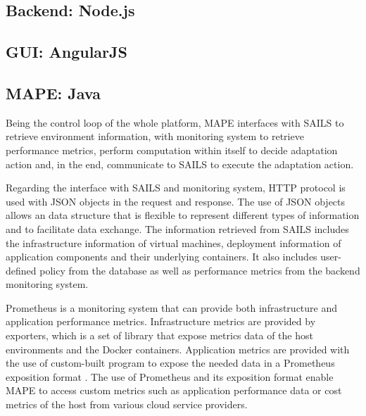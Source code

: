 \documentclass{seal_thesis}
\begin{document}
\subsection{Backend: Node.js}

\subsection{GUI: AngularJS}

\subsection{MAPE: Java}
Being the control loop of the whole platform, MAPE interfaces with SAILS to retrieve environment information, with monitoring system to retrieve performance metrics, perform computation within itself to decide adaptation action and, in the end, communicate to SAILS to execute the adaptation action.

Regarding the interface with SAILS and monitoring system, HTTP protocol is used with JSON objects in the request and response. The use of JSON objects allows an data structure that is flexible to represent different types of information and to facilitate data exchange. The information retrieved from SAILS includes the infrastructure information of virtual machines, deployment information of application components and their underlying containers. It also includes user-defined policy from the database as well as performance metrics from the backend monitoring system.

Prometheus  is a monitoring system that can provide both infrastructure and application performance metrics. Infrastructure metrics are provided by exporters, which is a set of library that expose metrics data of the host environments and the Docker containers. Application metrics are provided with the use of custom-built program to expose the needed data in a Prometheus exposition format . The use of Prometheus and its exposition format enable MAPE to access custom metrics such as application performance data or cost metrics of the host from various cloud service providers.

\end{document}
